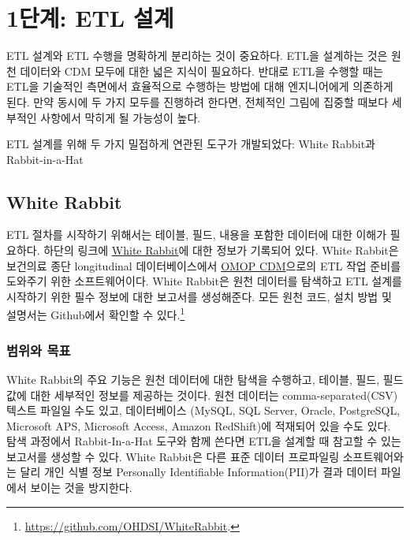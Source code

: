 \documentclass[10.5pt]{book}
\let\rmarkdownfootnote\footnote%
\def\footnote{\protect\rmarkdownfootnote}
\theoremstyle{definition}
\theoremstyle{definition}
\theoremstyle{definition}
\theoremstyle{remark}
\begin{document}
\section{1단계: ETL 설계}\label{-etl-}

ETL 설계와 ETL 수행을 명확하게 분리하는 것이 중요하다. ETL을 설계하는
것은 원천 데이터와 CDM 모두에 대한 넓은 지식이 필요하다. 반대로 ETL을
수행할 때는 ETL을 기술적인 측면에서 효율적으로 수행하는 방법에 대해
엔지니어에게 의존하게 된다. 만약 동시에 두 가지 모두를 진행하려 한다면,
전체적인 그림에 집중할 때보다 세부적인 사항에서 막히게 될 가능성이 높다.

ETL 설계를 위해 두 가지 밀접하게 연관된 도구가 개발되었다: White
Rabbit과 Rabbit-in-a-Hat

\subsection{White Rabbit}\label{white-rabbit}

ETL 절차를 시작하기 위해서는 테이블, 필드, 내용을 포함한 데이터에 대한
이해가 필요하다. 하단의 링크에
\href{https://github.com/OHDSI/WhiteRabbit}{White Rabbit}에 대한 정보가
기록되어 있다. White Rabbit은 보건의료 종단 longitudinal
데이터베이스에서 \href{https://github.com/OHDSI/CommonDataModel}{OMOP
CDM}으로의 ETL 작업 준비를 도와주기 위한 소프트웨어이다. White Rabbit은
원천 데이터를 탐색하고 ETL 설계를 시작하기 위한 필수 정보에 대한
보고서를 생성해준다. 모든 원천 코드, 설치 방법 및 설명서는 Github에서
확인할 수 있다.\footnote{\url{https://github.com/OHDSI/WhiteRabbit}.}
 

\subsubsection*{범위와 목표}\label{-}

White Rabbit의 주요 기능은 원천 데이터에 대한 탐색을 수행하고, 테이블,
필드, 필드 값에 대한 세부적인 정보를 제공하는 것이다. 원천 데이터는
comma-separated(CSV) 텍스트 파일일 수도 있고, 데이터베이스 (MySQL, SQL
Server, Oracle, PostgreSQL, Microsoft APS, Microsoft Access, Amazon
RedShift)에 적재되어 있을 수도 있다. 탐색 과정에서 Rabbit-In-a-Hat
도구와 함께 쓴다면 ETL을 설계할 때 참고할 수 있는 보고서를 생성할 수
있다. White Rabbit은 다른 표준 데이터 프로파일링 소프트웨어와는 달리
개인 식별 정보 Personally Identifiable Information(PII)가 결과 데이터
파일에서 보이는 것을 방지한다.
\end{document}
